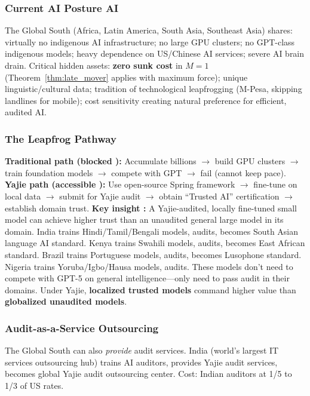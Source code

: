 \documentclass[11pt,a4paper]{article}
\theoremstyle{definition}
\theoremstyle{remark}
\newcommand{\MAone}{M=1}
\begin{document}
\subsubsection{Current AI Posture AI}
The Global South (Africa, Latin America, South Asia, Southeast Asia) shares: virtually no indigenous AI infrastructure; no large GPU clusters; no GPT-class indigenous models; heavy dependence on US/Chinese AI services; severe AI brain drain. Critical hidden assets: \textbf{zero sunk cost} in $\MAone$ (Theorem~\ref{thm:late_mover} applies with maximum force); unique linguistic/cultural data; tradition of technological leapfrogging (M-Pesa, skipping landlines for mobile); cost sensitivity creating natural preference for efficient, audited AI.
\subsubsection{The Leapfrog Pathway }
\textbf{Traditional path (blocked ):} Accumulate billions $\to$ build GPU clusters $\to$ train foundation models $\to$ compete with GPT $\to$ fail (cannot keep pace).
\textbf{Yajie path (accessible ):} Use open-source Spring framework $\to$ fine-tune on local data $\to$ submit for Yajie audit $\to$ obtain ``Trusted AI'' certification $\to$ establish domain trust.
\textbf{Key insight :} A Yajie-audited, locally fine-tuned small model can achieve higher trust than an unaudited general large model in its domain. India trains Hindi/Tamil/Bengali models, audits, becomes South Asian language AI standard. Kenya trains Swahili models, audits, becomes East African standard. Brazil trains Portuguese models, audits, becomes Lusophone standard. Nigeria trains Yoruba/Igbo/Hausa models, audits. These models don't need to compete with GPT-5 on general intelligence---only need to pass audit in their domains. Under Yajie, \textbf{localized trusted models} command higher value than \textbf{globalized unaudited models}.
\subsubsection{Audit-as-a-Service Outsourcing }
The Global South can also \textit{provide} audit services. India (world's largest IT services outsourcing hub) trains AI auditors, provides Yajie audit services, becomes global Yajie audit outsourcing center. Cost: Indian auditors at 1/5 to 1/3 of US rates.
\end{document}
